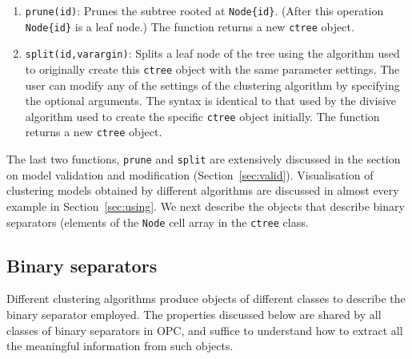\documentclass{book}
\begin{document}
\begin{enumerate}
\item {\tt prune(id)}: Prunes the subtree rooted at {\tt Node\{id\}}. 
(After this operation {\tt Node\{id\}} is a leaf node.) The function returns a new {\tt ctree} object.

\item {\tt split(id,varargin)}: Splits a leaf node of the tree using the algorithm
used to originally create this {\tt ctree} object with the same parameter settings.
The user can modify any of the settings of the clustering algorithm by specifying
the optional arguments. The syntax is identical to that used by the divisive algorithm
used to create the specific {\tt ctree} object initially. The function returns a new {\tt ctree} object.

\end{enumerate}

\noindent
%
The last two functions, {\tt prune} and {\tt split} are extensively discussed
in the section on model validation and modification (Section~\ref{sec:valid}).
%
Visualisation of clustering models obtained by different algorithms are
discussed in almost every example in Section~\ref{sec:using}.
%
We next describe the objects that describe binary separators (elements
of the {\tt Node} cell array in the {\tt ctree} class.

\subsection*{Binary separators}

Different clustering algorithms produce objects of different classes
to describe the binary separator employed.
%
The properties discussed below are shared by all classes of binary separators
in OPC, and suffice to understand how to extract all the meaningful information
from such objects.
\end{document}

